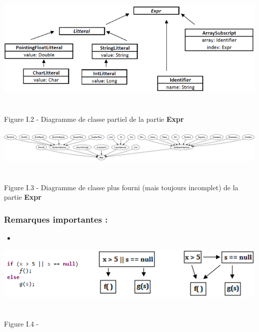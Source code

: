 \documentclass{report}
\begin{document}
\paragraph{}
\hspace{4mm}\textnormal{}

\begin{center}
\includegraphics[scale=0.9]{data/expr1.png}
~\\~\\Figure I.2 - Diagramme de classe partiel de la partie \textbf{Expr}
\end{center}

\paragraph{}
\hspace{4mm}\textnormal{}

\begin{center}
\includegraphics[scale=0.5]{data/expr2.png}
~\\~\\Figure I.3 - Diagramme de classe plus fourni (mais toujours incomplet) de la partie \textbf{Expr}
\end{center}

\subsubsection{Remarques importantes :}

\vspace{4mm}
\begin{itemize}
\item \vspace{1mm}
\end{itemize}

\begin{center}
\includegraphics[scale=0.85]{data/fail-fast.png}
~\\~\\Figure I.4 - 
\end{center}
\end{document}
